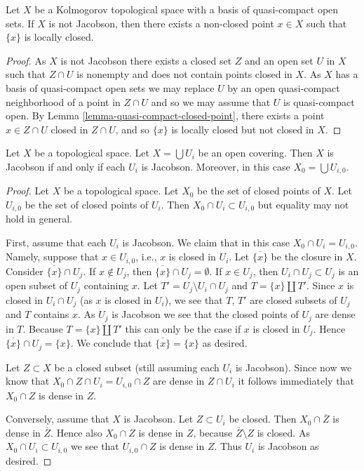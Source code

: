 \begin{lemma}
\label{lemma-non-jacobson-Noetherian-characterize}
Let $X$ be a Kolmogorov topological space with a basis of quasi-compact
open sets.
If $X$ is not Jacobson, then there exists a non-closed point
$x \in X$ such that $\{x\}$ is locally closed.
\end{lemma}

\begin{proof}
As $X$ is not Jacobson there exists a closed set $Z$ and an open set $U$
in $X$ such that $Z \cap U$ is nonempty and does not contain points closed
in $X$. As $X$ has a basis of quasi-compact open sets we may replace $U$
by an open quasi-compact neighborhood of a point in $Z\cap U$ and so we may
assume that $U$ is quasi-compact open. By
Lemma \ref{lemma-quasi-compact-closed-point}, there exists a point
$x \in Z \cap U$ closed in $Z \cap U$,
and so $\{x\}$ is locally closed but not closed in $X$.
\end{proof}

\begin{lemma}
\label{lemma-jacobson-local}
Let $X$ be a topological space.
Let $X = \bigcup U_i$ be an open covering.
Then $X$ is Jacobson if and only if each $U_i$ is Jacobson.
Moreover, in this case $X_0 = \bigcup U_{i, 0}$.
\end{lemma}

\begin{proof}
Let $X$ be a topological space.
Let $X_0$ be the set of closed points of $X$.
Let $U_{i, 0}$ be the set of closed points of
$U_i$. Then $X_0 \cap U_i \subset U_{i, 0}$
but equality may not hold in general.

\medskip\noindent
First, assume that each $U_i$ is Jacobson.
We claim that in this case $X_0 \cap U_i = U_{i, 0}$.
Namely, suppose that $x \in U_{i, 0}$, i.e., $x$ is closed in
$U_i$. Let $\overline{\{x\}}$ be the closure
in $X$. Consider $\overline{\{x\}} \cap U_j$.
If $x \not \in U_j$, then $\overline{\{x\}} \cap U_j = \emptyset$.
If $x \in U_j$, then $U_i \cap U_j \subset U_j$
is an open subset of $U_j$ containing $x$.
Let $T' = U_j \setminus U_i \cap U_j$ and
$T = \{x\} \amalg T'$. Since $x$ is closed in $U_i \cap U_j$
(as $x$ is closed in $U_i$), we see that $T$, $T'$
are closed subsets of $U_j$ and $T$ contains
$x$. As $U_j$ is Jacobson we see that the closed points of
$U_j$ are dense in $T$. Because $T = \{x\} \amalg T'$
this can only be the case if $x$ is closed in $U_j$.
Hence $\overline{\{x\}} \cap U_j = \{x\}$. We conclude
that $\overline{\{x\}} = \{ x \}$ as desired.

\medskip\noindent
Let $Z \subset X$ be a closed subset (still
assuming each $U_i$ is Jacobson).
Since now we know that $X_0 \cap Z  \cap U_i
= U_{i, 0} \cap Z$ are dense in $Z \cap U_i$
it follows immediately that $X_0 \cap Z$ is
dense in $Z$.

\medskip\noindent
Conversely, assume that $X$ is Jacobson.
Let $Z \subset U_i$ be closed. Then
$X_0 \cap \overline{Z}$ is dense in $\overline{Z}$.
Hence also $X_0 \cap Z$ is dense in $Z$, because
$\overline{Z} \setminus Z$ is closed. As $X_0 \cap U_i
\subset U_{i, 0}$ we see that
$U_{i, 0} \cap Z$ is dense in $Z$.
Thus $U_i$ is Jacobson as desired.
\end{proof}

